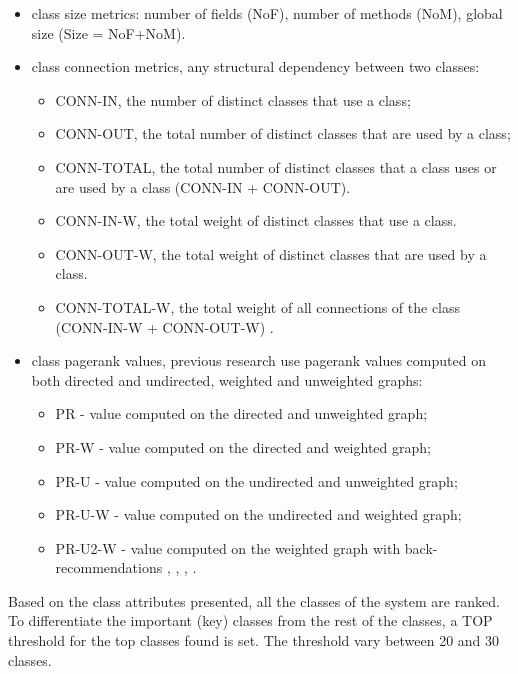 \documentclass[12pt]{mitthesis}
\begin{document}
\begin{itemize}
	\item class size metrics: number of fields (NoF),  number of methods (NoM), global size (Size = NoF+NoM).
	\item class connection metrics, any structural dependency between two classes:
		\begin{itemize}
			\item CONN-IN, the number of distinct classes that use a class;
			\item CONN-OUT, the total number of distinct classes that are used by a class;
			\item CONN-TOTAL, the total number of distinct classes that a class uses or are used by a class (CONN-IN + CONN-OUT).
			\item CONN-IN-W, the total weight of distinct classes that use a class. 
			\item CONN-OUT-W, the total weight of distinct classes that are used by a class. 
			\item CONN-TOTAL-W, the total weight of all connections of the class (CONN-IN-W + CONN-OUT-W) \cite{Finding-key-classes}.
		\end{itemize}
	\item class pagerank values, previous research use pagerank values computed on both directed and undirected, weighted and unweighted graphs:
		\begin{itemize}
			\item PR - value computed on the directed and unweighted graph;
			\item PR-W - value computed on the directed and weighted graph;
			\item PR-U - value computed on the undirected and unweighted graph;
			\item PR-U-W - value computed on the undirected and weighted graph;
			\item PR-U2-W - value computed on the weighted graph with back-recommendations \cite{PagerankENASE}, \cite{enase15}, \cite{Finding-key-classes}, \cite{PagerankSACI}.
		\end{itemize}
\end{itemize}


Based on the class attributes presented, all the classes of the system are ranked. To differentiate the important (key) classes from the rest of the classes, a TOP threshold for the top classes found is set. 
The threshold vary between 20 and 30 classes.
\end{document}
